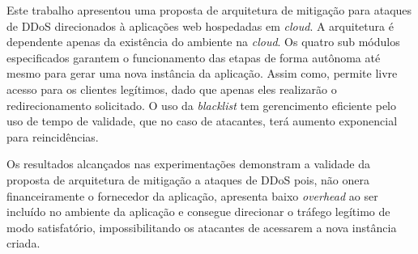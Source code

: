 
Este trabalho apresentou uma proposta de arquitetura de mitigação para ataques de DDoS direcionados à aplicações web hospedadas em \emph{cloud}. A arquitetura é dependente apenas da existência do ambiente na \emph{cloud}. Os quatro sub módulos especificados garantem o funcionamento das etapas de forma autônoma até mesmo para gerar uma nova instância da aplicação. Assim como, permite livre acesso para os clientes legítimos, dado que apenas eles realizarão o redirecionamento solicitado. O uso da \emph{blacklist} tem gerencimento eficiente pelo uso de tempo de validade, que no caso de atacantes, terá aumento exponencial para reincidências.

Os resultados alcançados nas experimentações demonstram a validade da proposta de arquitetura de mitigação a ataques de DDoS pois, não onera financeiramente o fornecedor da aplicação, apresenta baixo \emph{overhead} ao ser incluído no ambiente da aplicação e consegue direcionar o tráfego legítimo de modo satisfatório, impossibilitando os atacantes de acessarem a nova instância criada.

